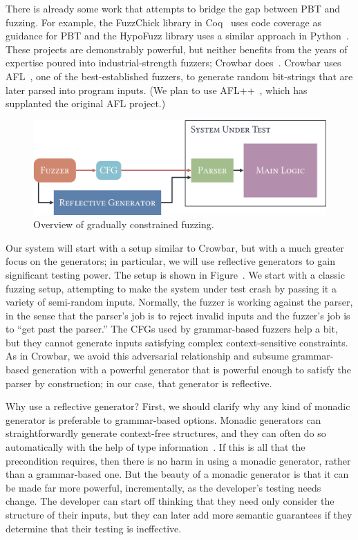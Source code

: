 There is already some work that attempts to bridge the gap between PBT and
fuzzing. For example, the FuzzChick library in Coq~\cite{OLDlampropoulos19fuzzchick}
uses code coverage as guidance for PBT and the HypoFuzz library uses a
similar approach in Python~\cite{hatfield-dodds_hypofuzz_nodate}. These projects
are demonstrably powerful, but neither benefits from the years of expertise
poured into industrial-strength fuzzers; Crowbar
does~\cite{dolan2017testing}. Crowbar uses
AFL~\cite{afl-readme}, one of the best-established
fuzzers, to generate random bit-strings that are later parsed into program
inputs.  (We plan to use AFL++~\cite{fioraldi_afl_2020},
which has supplanted the original AFL project.)

\begin{figure}
  \centering
  \includegraphics[width=.4\textwidth]{assets/fuzzing.pdf}
  \caption{Overview of gradually constrained fuzzing.}\label{fig:fuzzing-plan}
\end{figure}

Our system will start with a setup similar to Crowbar, but with a much greater
focus on the generators; in particular, we will use reflective generators to
gain significant testing power. The setup is shown in
Figure~. We start with a classic fuzzing setup, attempting
to make the system under test crash by passing it a variety of semi-random
inputs. Normally, the fuzzer is working against the parser, in the sense that
the parser's job is to reject invalid inputs and the fuzzer's job is to ``get
past the parser.'' The CFGs used by grammar-based fuzzers help a bit, but they
cannot generate inputs satisfying complex context-sensitive constraints. As in
Crowbar, we avoid this adversarial relationship and subsume grammar-based
generation with a powerful generator that is powerful enough to satisfy the
parser by construction; in our case, that generator is reflective.

Why use a reflective generator? First, we should clarify why any kind of monadic
generator is preferable to grammar-based options. Monadic generators can
straightforwardly generate context-free structures, and they can often do so
automatically with the help of type information~\cite{mista2019deriving}. If
this is all that the precondition requires, then there is no harm in using a
monadic generator, rather than a grammar-based one. But the beauty of a monadic
generator is that it can be made far more powerful, incrementally, as the
developer's testing needs change. The developer can start off thinking that they
need only consider the structure of their inputs, but they can later add more
semantic guarantees if they determine that their testing is ineffective.

